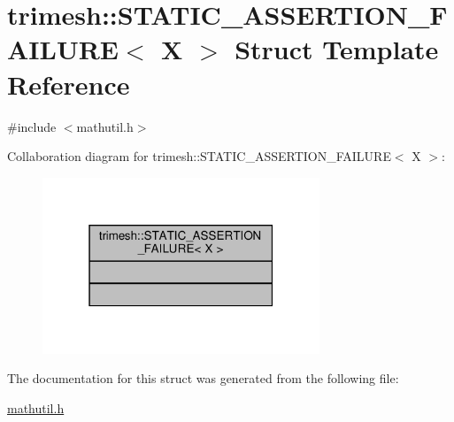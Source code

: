 \hypertarget{structtrimesh_1_1STATIC__ASSERTION__FAILURE}{}\section{trimesh\+:\+:S\+T\+A\+T\+I\+C\+\_\+\+A\+S\+S\+E\+R\+T\+I\+O\+N\+\_\+\+F\+A\+I\+L\+U\+RE$<$ X $>$ Struct Template Reference}
\label{structtrimesh_1_1STATIC__ASSERTION__FAILURE}


{\ttfamily \#include $<$mathutil.\+h$>$}



Collaboration diagram for trimesh\+:\+:S\+T\+A\+T\+I\+C\+\_\+\+A\+S\+S\+E\+R\+T\+I\+O\+N\+\_\+\+F\+A\+I\+L\+U\+RE$<$ X $>$\+:\nopagebreak
\begin{figure}[H]
\begin{center}
\leavevmode
\includegraphics[width=235pt]{db/d8f/structtrimesh_1_1STATIC__ASSERTION__FAILURE__coll__graph}
\end{center}
\end{figure}


The documentation for this struct was generated from the following file\+:\begin{DoxyCompactItemize}
\item 
\hyperlink{mathutil_8h}{mathutil.\+h}\end{DoxyCompactItemize}
